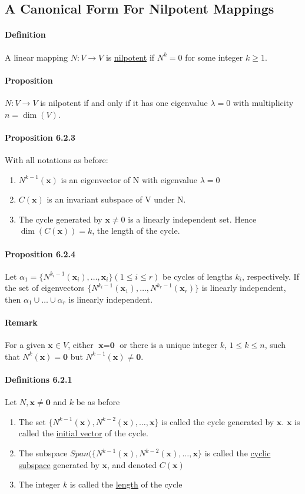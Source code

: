 \documentclass[11pt]{article}
\newcommand{\tb}[1]{\textbf{#1}}
\newcommand{\under}[1]{\underline{#1}}
\newcommand{\vx}[0]{\tb{x}}
\newcommand{\vo}[0]{\tb{0}}
\begin{document}
{\subsection{A Canonical Form For Nilpotent Mappings}
\paragraph{Definition} A linear mapping $N: V \rightarrow V$ is \under{nilpotent} if $N^k = 0$ for some integer $k \geq 1$.
\paragraph{Proposition} $N: V \rightarrow V$ is nilpotent if and only if it has one eigenvalue $\lambda = 0$ with multiplicity $n = \dim(V)$.
\paragraph{Proposition 6.2.3} With all notations as before:
\begin{enumerate}
	\item $N^{k-1}(\vx)$ is an eigenvector of N with eigenvalue $\lambda = 0$
	\item $C(\vx)$ is an invariant subspace of V under N.
	\item The cycle generated by $\vx \neq 0$ is a linearly independent set. Hence $\dim(C(\vx)) = k$, the length of the cycle.
\end{enumerate}
\paragraph{Proposition 6.2.4} Let $\alpha_1 = \{N^{k_i - 1}(\vx_i),\hdots,\vx_i\} (1\leq i \leq r)$ be cycles of lengths $k_i$, respectively. If the set of eigenvectors $\{N^{k_i-1}(\vx_1),\hdots,N^{k_r-1}(\vx_r)\}$ is linearly independent, then $\alpha_1 \cup \hdots \cup \alpha_r$ is linearly independent.
\paragraph{Remark} For a given $\vx \in V$, either $\vx = \vo$ or there is a unique integer $k$, $1 \leq k \leq n$, such that $N^k(\vx) = \vo$ but $N^{k-1}(\vx) \neq \vo$. 
\paragraph{Definitions 6.2.1} Let $N, \vx \neq \vo$ and $k$ be as before
\begin{enumerate}
	\item The set $\{ N^{k-1}(\vx),N^{k-2}(\vx),\hdots,\vx\}$ is called the cycle generated by $\vx$. $\vx$ is called the \under{initial vector} of the cycle.
	\item The subspace $Span(\{N^{k-1}(\vx), N^{k-2}(\vx),\hdots,\vx\}$ is called the \under{cyclic subspace} generated by $\vx$, and denoted $C(\vx)$
	\item The integer $k$ is called the \under{length} of the cycle
\end{enumerate}
}
\end{document}
